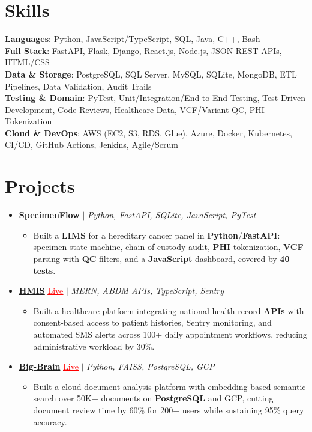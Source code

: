 \documentclass[letterpaper,10pt]{article}
\newcommand{\itemTail}{\vspace{-4pt}}
\newcommand{\sectionGap}{\vspace{-8pt}}
\newcommand{\projGap}{\vspace{3pt}}
\newcommand{\resumeItem}[1]{\item\small{{#1 \itemTail}}}
\newcommand{\resumeProjectHeading}[1]{\item \small #1 \vspace{-2pt}}
\newcommand{\resumeProjectLink}[2]{\href{#1}{\textcolor{red}{\underline{#2}}}}
\newcommand{\resumeSubHeadingListStart}{\begin{itemize}[leftmargin=0.0in, label={}]}
\newcommand{\resumeSubHeadingListEnd}{\end{itemize}}
\newcommand{\resumeProjItemListStart}{\begin{itemize}[leftmargin=0.15in,label=\textbullet,itemsep=3pt,topsep=0pt,parsep=0pt,partopsep=0pt]}
\newcommand{\resumeProjItemListEnd}{\end{itemize}\vspace{-4pt}}
\begin{document}
\section{Skills}
\begin{itemize}[leftmargin=0.15in, label={}]
\small{\item{
\textbf{Languages}: Python, JavaScript/TypeScript, SQL, Java, C++, Bash \\
\textbf{Full Stack}: FastAPI, Flask, Django, React.js, Node.js, JSON REST APIs, HTML/CSS \\
\textbf{Data \& Storage}: PostgreSQL, SQL Server, MySQL, SQLite, MongoDB, ETL Pipelines, Data Validation, Audit Trails \\
\textbf{Testing \& Domain}: PyTest, Unit/Integration/End-to-End Testing, Test-Driven Development, Code Reviews, Healthcare Data, VCF/Variant QC, PHI Tokenization \\
\textbf{Cloud \& DevOps}: AWS (EC2, S3, RDS, Glue), Azure, Docker, Kubernetes, CI/CD, GitHub Actions, Jenkins, Agile/Scrum
}}
\end{itemize}
\sectionGap
\section{Projects}
\resumeSubHeadingListStart
\vspace{-2pt}
\resumeProjectHeading{\textbf{SpecimenFlow} $|$ \emph{Python, FastAPI, SQLite, JavaScript, PyTest}}
\resumeProjItemListStart
\resumeItem{Built a \textbf{LIMS} for a hereditary cancer panel in \textbf{Python}/\textbf{FastAPI}: specimen state machine, chain-of-custody audit, \textbf{PHI} tokenization, \textbf{VCF} parsing with \textbf{QC} filters, and a \textbf{JavaScript} dashboard, covered by \textbf{40 tests}.}
\resumeProjItemListEnd
\projGap
\resumeProjectHeading{\href{https://hims-rouge.vercel.app/}{\textbf{HMIS}} {\resumeProjectLink{https://hims-rouge.vercel.app/}{Live}} $|$ \emph{MERN, ABDM APIs, TypeScript, Sentry}}
\resumeProjItemListStart
\resumeItem{Built a healthcare platform integrating national health-record \textbf{APIs} with consent-based access to patient histories, Sentry monitoring, and automated SMS alerts across 100+ daily appointment workflows, reducing administrative workload by 30\%.}
\resumeProjItemListEnd
\projGap
\resumeProjectHeading{\href{https://big-brain-pied.vercel.app/}{\textbf{Big-Brain}} {\resumeProjectLink{https://big-brain-pied.vercel.app/}{Live}} $|$ \emph{Python, FAISS, PostgreSQL, GCP}}
\resumeProjItemListStart
\resumeItem{Built a cloud document-analysis platform with embedding-based semantic search over 50K+ documents on \textbf{PostgreSQL} and GCP, cutting document review time by 60\% for 200+ users while sustaining 95\% query accuracy.}
\resumeProjItemListEnd
\resumeSubHeadingListEnd
\end{document}
